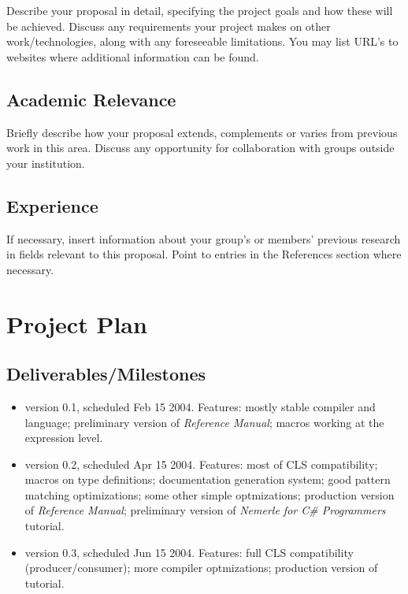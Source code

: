 \documentclass[a4paper,11pt]{article}
\begin{document}
Describe your proposal in detail, specifying the project goals and how
these will be achieved. Discuss any requirements your project makes on
other work/technologies, along with any foreseeable limitations. You
may list URL's to websites where additional information can be found.


\subsection{Academic Relevance}

Briefly describe how your proposal extends, complements or varies from
previous work in this area. Discuss any opportunity for collaboration
with groups outside your institution.


\subsection{Experience}

If necessary, insert information about your group's or members' previous
research in fields relevant to this proposal. Point to entries in the
References section where necessary.

\section{Project Plan}

\subsection{Deliverables/Milestones}

\begin{itemize}
\item version 0.1, scheduled Feb 15 2004. Features:
  mostly stable compiler and language;
  preliminary version of \textit{Reference Manual}; 
  macros working at the expression level.

\item version 0.2, scheduled Apr 15 2004. Features:
  most of CLS compatibility;
  macros on type definitions;
  documentation generation system;
  good pattern matching optimizations;
  some other simple optmizations;
  production version of \textit{Reference Manual};
  preliminary version of \textit{Nemerle for C\# Programmers} tutorial.

\item version 0.3, scheduled Jun 15 2004. Features:
  full CLS compatibility (producer/consumer);
  more compiler optmizations;
  production version of tutorial.
\end{itemize}
\end{document}
